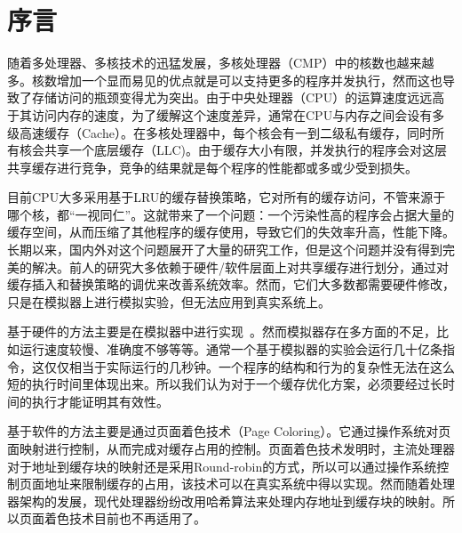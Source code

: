 
\chapter{序言} \label{chap:introduction}
随着多处理器、多核技术的迅猛发展，多核处理器（CMP）中的核数也越来越多。核数增加一个显而易见的优点就是可以支持更多的程序并发执行，然而这也导致了存储访问的瓶颈变得尤为突出。由于中央处理器（CPU）的运算速度远远高于其访问内存的速度，为了缓解这个速度差异，通常在CPU与内存之间会设有多级高速缓存（Cache）。在多核处理器中，每个核会有一到二级私有缓存，同时所有核会共享一个底层缓存（LLC)。由于缓存大小有限，并发执行的程序会对这层共享缓存进行竞争，竞争的结果就是每个程序的性能都或多或少受到损失。

目前CPU大多采用基于LRU的缓存替换策略，它对所有的缓存访问，不管来源于哪个核，都“一视同仁”。这就带来了一个问题：一个污染性高的程序会占据大量的缓存空间，从而压缩了其他程序的缓存使用，导致它们的失效率升高，性能下降。长期以来，国内外对这个问题展开了大量的研究工作，但是这个问题并没有得到完美的解决。前人的研究大多依赖于硬件/软件层面上对共享缓存进行划分，通过对缓存插入和替换策略的调优来改善系统效率。然而，它们大多数都需要硬件修改，只是在模拟器上进行模拟实验，但无法应用到真实系统上。

基于硬件的方法主要是在模拟器中进行实现~\parencite{suh2004dynamic,qureshi2006utility,qureshi2007adaptive,hsu2006communist,iyer2004cqos,kim2004fair,rafique2006architectural,xie2009pipp}。然而模拟器存在多方面的不足，比如运行速度较慢、准确度不够等等。通常一个基于模拟器的实验会运行几十亿条指令，这仅仅相当于实际运行的几秒钟。一个程序的结构和行为的复杂性无法在这么短的执行时间里体现出来。所以我们认为对于一个缓存优化方案，必须要经过长时间的执行才能证明其有效性。

基于软件的方法主要是通过页面着色技术（Page Coloring）。它通过操作系统对页面映射进行控制，从而完成对缓存占用的控制。页面着色技术发明时，主流处理器对于地址到缓存块的映射还是采用Round-robin的方式，所以可以通过操作系统控制页面地址来限制缓存的占用，该技术可以在真实系统中得以实现。然而随着处理器架构的发展，现代处理器纷纷改用哈希算法来处理内存地址到缓存块的映射。所以页面着色技术目前也不再适用了。

